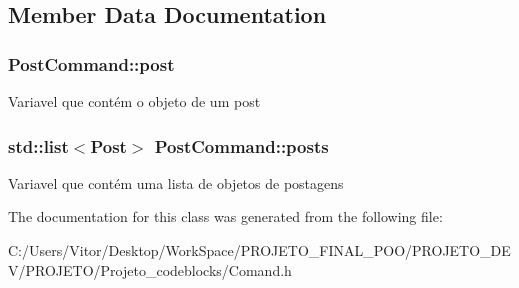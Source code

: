 \subsection{Member Data Documentation}
\hypertarget{class_post_command_a742316428e6f664b6f81334febfe3bf2}{
\subsubsection[{post}]{ Post\-Command\-::post\hspace{0.3cm}{\ttfamily [protected]}}}\label{class_post_command_a742316428e6f664b6f81334febfe3bf2}
Variavel que contém o objeto de um post \hypertarget{class_post_command_ad6f46406bfc537c8cd5250fe82fc1a0a}{
\subsubsection[{posts}]{\setlength{\rightskip}{0pt plus 5cm}std\-::list$<${\bf Post}$>$ Post\-Command\-::posts\hspace{0.3cm}{\ttfamily [protected]}}}\label{class_post_command_ad6f46406bfc537c8cd5250fe82fc1a0a}
Variavel que contém uma lista de objetos de postagens 

The documentation for this class was generated from the following file\-:\begin{DoxyCompactItemize}
\item 
C\-:/\-Users/\-Vitor/\-Desktop/\-Work\-Space/\-P\-R\-O\-J\-E\-T\-O\-\_\-\-F\-I\-N\-A\-L\-\_\-\-P\-O\-O/\-P\-R\-O\-J\-E\-T\-O\-\_\-\-D\-E\-V/\-P\-R\-O\-J\-E\-T\-O/\-Projeto\-\_\-codeblocks/Comand.\-h\end{DoxyCompactItemize}
